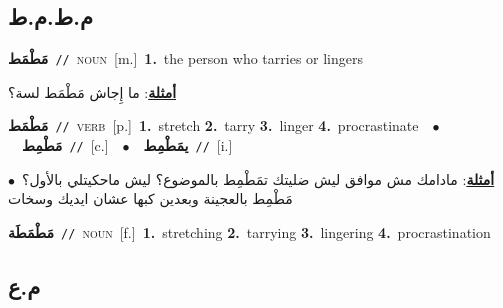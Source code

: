 \documentclass[10pt,a4paper,twoside]{article} %
\begin{document}
\begin{multicols}{2}
\vspace{-3mm}
\subsection*{\color{blue}\foreignlanguage{arabic}{م.ط.م.ط}\color{blue}{}} 

{\setlength\topsep{0pt}\textbf{\foreignlanguage{arabic}{مَطْمَط}}\ {\color{gray}\texttt{//}\color{black}}\ \textsc{noun}\ [m.]\ \textbf{1.}~the person who tarries or lingers\  \begin{flushright}\color{gray}\foreignlanguage{arabic}{\textbf{\underline{\foreignlanguage{arabic}{أمثلة}}}: ما إِجاش مَطْمَط لسة؟}\end{flushright}\color{black}} \vspace{2mm}

{\setlength\topsep{0pt}\textbf{\foreignlanguage{arabic}{مَطْمَط}}\ {\color{gray}\texttt{//}\color{black}}\ \textsc{verb}\ [p.]\ \textbf{1.}~stretch  \textbf{2.}~tarry  \textbf{3.}~linger  \textbf{4.}~procrastinate\ \ $\bullet$\ \ \setlength\topsep{0pt}\textbf{\foreignlanguage{arabic}{مَطْمِط}}\ {\color{gray}\texttt{//}\color{black}}\ [c.]\ \ $\bullet$\ \ \setlength\topsep{0pt}\textbf{\foreignlanguage{arabic}{يمَطْمِط}}\ {\color{gray}\texttt{//}\color{black}}\ [i.]\  \begin{flushright}\color{gray}\foreignlanguage{arabic}{\textbf{\underline{\foreignlanguage{arabic}{أمثلة}}}: مادامك مش موافق ليش ضليتك تمَطْمِط بالموضوع؟ ليش ماحكيتلي بالأول؟\ $\bullet$\ \  مَطْمِط بالعجينة وبعدين كبها عشان ايديك وسخات}\end{flushright}\color{black}} \vspace{2mm}

{\setlength\topsep{0pt}\textbf{\foreignlanguage{arabic}{مَطْمَطَة}}\ {\color{gray}\texttt{//}\color{black}}\ \textsc{noun}\ [f.]\ \textbf{1.}~stretching  \textbf{2.}~tarrying  \textbf{3.}~lingering  \textbf{4.}~procrastination\ } \vspace{2mm}

\vspace{-3mm}
\subsection*{\color{blue}\foreignlanguage{arabic}{م.ع}\color{blue}{ (ntws)}} 


\end{multicols}
\end{document}
